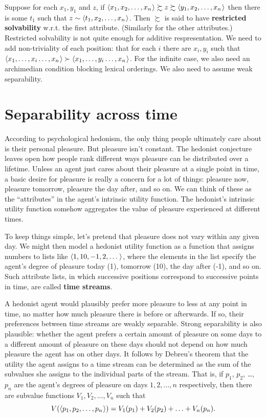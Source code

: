 {  Suppose for each $x_1,y_1$ and $z$, if
  $\t{x_1,x_2,\ldots,x_n} \succsim z \succsim \t{y_1,x_2,\ldots,x_n}$ then there
  is some $t_1$ such that $z \sim \t{t_1, x_2,\ldots, x_n}$. Then $\succsim$ is
  said to have \textbf{restricted solvability} w.r.t. the first attribute.
  (Similarly for the other attributes.) Restricted solvability is not quite
  enough for additive respresentation. We need to add non-triviality of each
  position: that for each $i$ there are $x_i, y_i$ such that
  $\t{x_1,\ldots,x_i\ldots,x_n} \succ \t{x_1,\ldots,y_i\ldots,x_n}$. For the
  infinite case, we also need an archimedian condition blocking lexical
  orderings. We also need to assume weak separability.

} %


\section{Separability across time}\label{sec:separability-time}

According to psychological hedonism, the only thing people ultimately care about
is their personal pleasure. But pleasure isn't constant. The hedonist conjecture
leaves open how people rank different ways pleasure can be distributed over a
lifetime. Unless an agent just cares about their pleasure at a single point in
time, a basic desire for pleasure is really a concern for a lot of things:
pleasure now, pleasure tomorrow, pleasure the day after, and so on. We can think
of these as the ``attributes'' in the agent's intrinsic utility function. The
hedonist's intrinsic utility function somehow aggregates the value of pleasure
experienced at different times.

To keep things simple, let's pretend that pleasure does not vary within any
given day. We might then model a hedonist utility function as a function that
assigns numbers to lists like $\t{1,10,-1,2,\ldots}$, where the elements in the
list specify the agent's degree of pleasure today (1), tomorrow (10), the day
after (-1), and so on. Such attribute lists, in which successive positions
correspond to successive points in time, are called \textbf{time streams}.

A hedonist agent would plausibly prefer more pleasure to less at any point in
time, no matter how much pleasure there is before or afterwards. If so, their
preferences between time streams are weakly separable. Strong separability is
also plausible: whether the agent prefers a certain amount of pleasure on some
days to a different amount of pleasure on these days should not depend on how
much pleasure the agent has on other days. It follows by Debreu's theorem that
the utility the agent assigns to a time stream can be determined as the sum of the
subvalues she assigns to the individual parts of the stream. That is, if $p_1$,
$p_2$, \ldots, $p_n$ are the agent's degrees of pleasure on days
$1, 2, \ldots, n$ respectively, then there are subvalue functions
$V_1,V_2,\ldots,V_n$ such that
\[
V(\t{p_1,p_2,\ldots,p_n}) = V_1(p_1) + V_2(p_2) + \ldots + V_n(p_n).
\]

